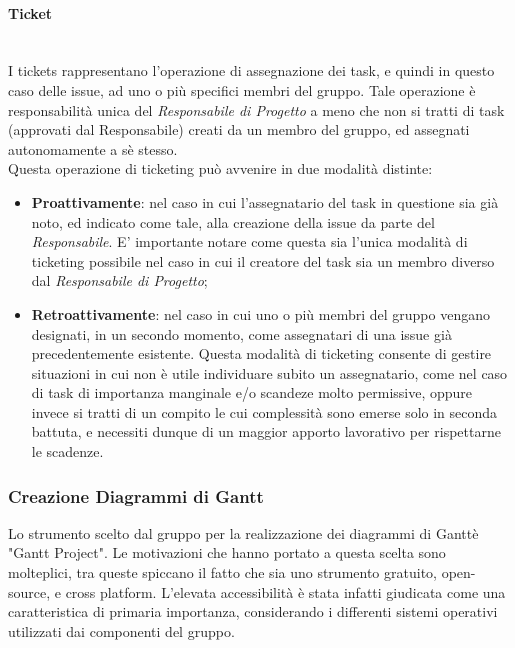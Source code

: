 \paragraph{Ticket} ~\\
I tickets rappresentano l'operazione di assegnazione dei task, e quindi in questo caso delle issue, ad uno o più specifici membri del gruppo. Tale operazione è responsabilità unica del \textit{Responsabile di Progetto} a meno che non si tratti di task (approvati dal Responsabile) creati da un membro del gruppo, ed assegnati autonomamente a sè stesso.\\
Questa operazione di ticketing può avvenire in due modalità distinte:
\begin{itemize}
	\item \textbf{Proattivamente}: nel caso in cui l'assegnatario del task in questione sia già noto, ed indicato come tale, alla creazione della issue da parte del \textit{Responsabile}. E' importante notare come questa sia l'unica modalità di ticketing possibile nel caso in cui il creatore del task sia un membro diverso dal \textit{Responsabile di Progetto};
	\item \textbf{Retroattivamente}: nel caso in cui uno o più membri del gruppo vengano designati, in un secondo momento, come assegnatari di una issue già precedentemente esistente. Questa modalità di ticketing consente di gestire situazioni in cui non è utile individuare subito un assegnatario, come nel caso di task di importanza manginale e/o scandeze molto permissive, oppure invece si tratti di un compito le cui complessità sono emerse solo in seconda battuta, e necessiti dunque di un maggior apporto lavorativo per rispettarne le scadenze.
\end{itemize}

\subsubsection{Creazione Diagrammi di Gantt}\label{StrumentoGantt}
	Lo strumento scelto dal gruppo per la realizzazione dei diagrammi di Gantt\glossario è "Gantt Project". Le 					motivazioni che hanno portato a questa scelta sono molteplici, tra queste spiccano il fatto che sia uno strumento 	gratuito, open-source\glossario, e cross platform. L'elevata accessibilità è stata infatti 				giudicata come una caratteristica di primaria importanza, considerando i differenti sistemi operativi utilizzati 		dai componenti del gruppo.


